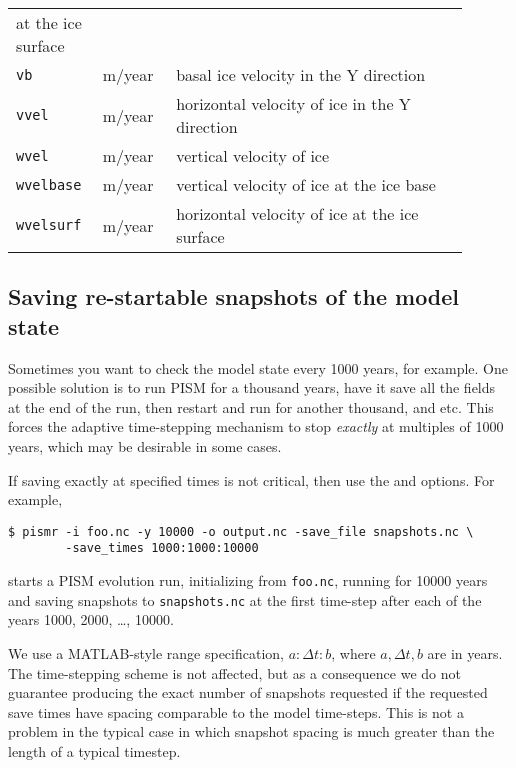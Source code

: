 \begin{table}[ht]
\begin{longtable}{p{0.15\linewidth}p{0.15\linewidth}p{0.6\linewidth}}
    at the ice surface\\
    \texttt{vb} & m/year & basal ice velocity in the Y direction \\
    \texttt{vvel} & m/year & horizontal velocity of ice in the Y direction \\
    \texttt{wvel} & m/year & vertical velocity of ice \\
    \texttt{wvelbase} & m/year &vertical velocity of ice at the ice base\\
    \texttt{wvelsurf} & m/year & horizontal velocity of ice at the ice surface\\
    \hline
  \end{longtable}
\normalsize
 \label{tab:extra-vars}
\end{table}

\clearpage

\subsection{Saving re-startable snapshots of the model state}
\label{sec:snapshots}  Sometimes you want to check the model state every 1000 years, for example.  One possible solution is to run PISM for a thousand years, have it save all the fields at the end of the run, then restart and run for another thousand, and etc.  This forces the adaptive time-stepping mechanism to stop \emph{exactly} at multiples of 1000 years, which may be desirable in some cases.

If saving exactly at specified times is not critical, then use the  and  options.  For example,
\begin{verbatim}
$ pismr -i foo.nc -y 10000 -o output.nc -save_file snapshots.nc \
        -save_times 1000:1000:10000
\end{verbatim}
starts a PISM evolution run, initializing from \verb|foo.nc|, running for
10000 years and saving snapshots to \verb|snapshots.nc| at the first time-step
after each of the years 1000, 2000, \dots, 10000.

We use a MATLAB-style range specification, $a:\Delta t:b$, where $a,\Delta t,b$ are in years.  The time-stepping scheme is not affected, but as a consequence we do not guarantee producing the exact number of snapshots requested if the requested save times have spacing comparable to the model time-steps.  This is not a problem in the typical case in which snapshot spacing is much greater than the length of a typical timestep.

